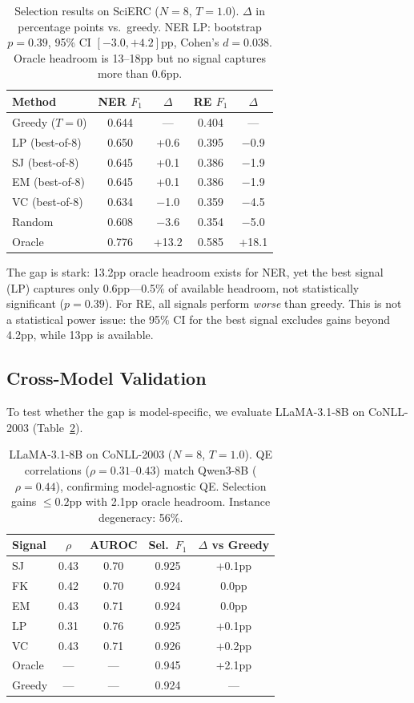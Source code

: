 \documentclass[11pt]{article}
\begin{document}
\begin{table}[t]
\centering
\small
\begin{tabular}{lcccc}
\toprule
Method & NER $F_1$ & $\Delta$ & RE $F_1$ & $\Delta$ \\
\midrule
Greedy ($T=0$) & 0.644 & --- & 0.404 & --- \\
\midrule
LP (best-of-8) & 0.650 & +0.6 & 0.395 & $-$0.9 \\
SJ (best-of-8) & 0.645 & +0.1 & 0.386 & $-$1.9 \\
EM (best-of-8) & 0.645 & +0.1 & 0.386 & $-$1.9 \\
VC (best-of-8) & 0.634 & $-$1.0 & 0.359 & $-$4.5 \\
Random & 0.608 & $-$3.6 & 0.354 & $-$5.0 \\
\midrule
Oracle & 0.776 & +13.2 & 0.585 & +18.1 \\
\bottomrule
\end{tabular}
\caption{Selection results on SciERC ($N=8$, $T=1.0$). $\Delta$ in percentage points vs.\ greedy. NER LP: bootstrap $p = 0.39$, 95\% CI $[-3.0, +4.2]$pp, Cohen's $d = 0.038$. Oracle headroom is 13--18pp but no signal captures more than 0.6pp.}
\label{tab:selection}
\end{table}

The gap is stark: 13.2pp oracle headroom exists for NER, yet the best signal (LP) captures only 0.6pp---0.5\% of available headroom, not statistically significant ($p = 0.39$). For RE, all signals perform \emph{worse} than greedy. This is not a statistical power issue: the 95\% CI for the best signal excludes gains beyond 4.2pp, while 13pp is available.

\subsection{Cross-Model Validation}

To test whether the gap is model-specific, we evaluate LLaMA-3.1-8B on CoNLL-2003 (Table~\ref{tab:llama_conll}).

\begin{table}[t]
\centering
\small
\begin{tabular}{lcccc}
\toprule
Signal & $\rho$ & AUROC & Sel.\ $F_1$ & $\Delta$ vs Greedy \\
\midrule
SJ & 0.43 & 0.70 & 0.925 & +0.1pp \\
FK & 0.42 & 0.70 & 0.924 & 0.0pp \\
EM & 0.43 & 0.71 & 0.924 & 0.0pp \\
LP & 0.31 & 0.76 & 0.925 & +0.1pp \\
VC & 0.43 & 0.71 & 0.926 & +0.2pp \\
\midrule
Oracle & --- & --- & 0.945 & +2.1pp \\
Greedy & --- & --- & 0.924 & --- \\
\bottomrule
\end{tabular}
\caption{LLaMA-3.1-8B on CoNLL-2003 ($N=8$, $T=1.0$). QE correlations ($\rho = 0.31$--$0.43$) match Qwen3-8B ($\rho = 0.44$), confirming model-agnostic QE. Selection gains $\leq 0.2$pp with 2.1pp oracle headroom. Instance degeneracy: 56\%.}
\label{tab:llama_conll}
\end{table}
\end{document}
